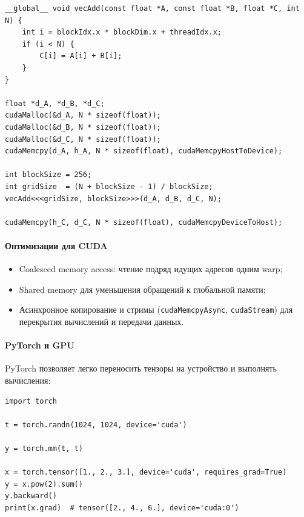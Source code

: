 \begin{center}
  \label{lst:cuda_vecadd}
  \medskip
  \begin{verbatim}
__global__ void vecAdd(const float *A, const float *B, float *C, int N) {
    int i = blockIdx.x * blockDim.x + threadIdx.x;
    if (i < N) {
        C[i] = A[i] + B[i];
    }
}

float *d_A, *d_B, *d_C;
cudaMalloc(&d_A, N * sizeof(float));
cudaMalloc(&d_B, N * sizeof(float));
cudaMalloc(&d_C, N * sizeof(float));
cudaMemcpy(d_A, h_A, N * sizeof(float), cudaMemcpyHostToDevice);

int blockSize = 256;
int gridSize  = (N + blockSize - 1) / blockSize;
vecAdd<<<gridSize, blockSize>>>(d_A, d_B, d_C, N);

cudaMemcpy(h_C, d_C, N * sizeof(float), cudaMemcpyDeviceToHost);
\end{verbatim}
\end{center}

\paragraph{Оптимизации для CUDA}
\begin{itemize}
  \item Coalesced memory access: чтение подряд идущих адресов одним warp;
  \item Shared memory для уменьшения обращений к глобальной памяти;
  \item Асинхронное копирование и стримы (\texttt{cudaMemcpyAsync}, \texttt{cudaStream}) для перекрытия вычислений и передачи данных.
\end{itemize}

\paragraph{PyTorch и GPU}
PyTorch позволяет легко переносить тензоры на устройство и выполнять вычисления:
\begin{center}
\begin{verbatim}
import torch

t = torch.randn(1024, 1024, device='cuda')

y = torch.mm(t, t)

x = torch.tensor([1., 2., 3.], device='cuda', requires_grad=True)
y = x.pow(2).sum()
y.backward()
print(x.grad)  # tensor([2., 4., 6.], device='cuda:0')
\end{verbatim} 
\end{center}

